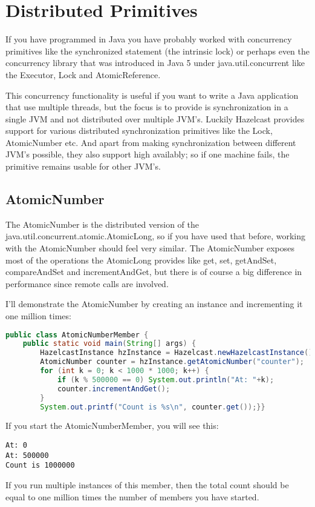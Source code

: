 \chapter{Distributed Primitives}
If you have programmed in Java you have probably worked with concurrency primitives like the synchronized statement (the intrinsic lock) or perhaps even the concurrency library that was introduced in Java 5 under java.util.concurrent like the Executor, Lock and AtomicReference.

This concurrency functionality is useful if you want to write a Java application that use multiple threads, but the focus is to provide is synchronization in a single JVM and not distributed over multiple JVM's. Luckily Hazelcast provides support for various distributed synchronization primitives like the Lock, AtomicNumber etc. And apart from making synchronization between different JVM's possible, they also support high availably; so if one machine fails, the primitive remains usable for other JVM's.

\section{AtomicNumber}
The AtomicNumber is the distributed version of the java.util.concurrent.atomic.AtomicLong, so if you have used that before, working with the AtomicNumber should feel very similar. The AtomicNumber exposes most of the operations the AtomicLong provides like get, set, getAndSet, compareAndSet and incrementAndGet, but there is of course a big difference in performance since remote calls are involved.

I'll demonstrate the AtomicNumber by creating an instance and incrementing it one million times:
\begin{lstlisting}[language=java]
public class AtomicNumberMember {
    public static void main(String[] args) {
        HazelcastInstance hzInstance = Hazelcast.newHazelcastInstance();
        AtomicNumber counter = hzInstance.getAtomicNumber("counter");
        for (int k = 0; k < 1000 * 1000; k++) {
            if (k % 500000 == 0) System.out.println("At: "+k);
            counter.incrementAndGet();
        }
        System.out.printf("Count is %s\n", counter.get());}}
\end{lstlisting}
If you start the AtomicNumberMember, you will see this:
\begin{lstlisting}
At: 0
At: 500000
Count is 1000000
\end{lstlisting}
If you run multiple instances of this member, then the total count should be equal to one million times the number of members you have started.

